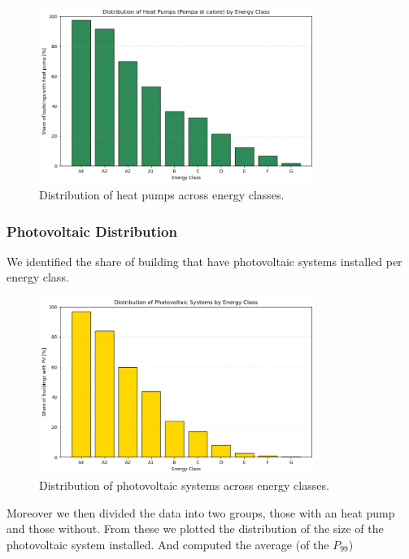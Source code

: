 \begin{figure}[H]
    \centering
    \includegraphics[width=0.8\textwidth]{figures/1_heat_pump_distribution.png}
    \caption{Distribution of heat pumps across energy classes.}
    \label{fig:heat_pump_distribution}
\end{figure}

\subsubsection{Photovoltaic Distribution}
We identified the share of building that have photovoltaic systems installed per energy class.
\begin{figure}[H]
    \centering
    \includegraphics[width=0.8\textwidth]{figures/1_photovoltaic_distribution.png}
    \caption{Distribution of photovoltaic systems across energy classes.}
    \label{fig:pv_distribution}
\end{figure}

Moreover we then divided the data into two groups, those with an heat pump and those without.
From these we plotted the distribution of the size of the photovoltaic system installed. And computed the average (of the $P_99$)


